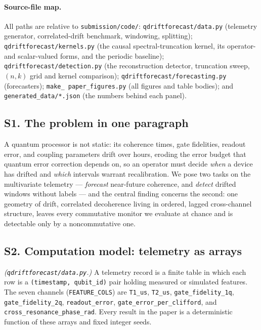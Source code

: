 \documentclass[
  aps,
  prresearch,
  reprint,
  amsmath,
  amssymb,
  nofootinbib,
  floatfix,
]{revtex4-2}
\begin{document}
\paragraph{Source-file map.} All paths are relative to \texttt{submission/code/}:
\texttt{qdriftforecast/data.py} (telemetry generator, correlated-drift benchmark,
windowing, splitting); \texttt{qdriftforecast/kernels.py} (the causal
spectral-truncation kernel, its operator- and scalar-valued forms, and the
periodic baseline); \texttt{qdriftforecast/detection.py} (the reconstruction
detector, truncation sweep, $(n,k)$ grid and kernel comparison);
\texttt{qdriftforecast/forecasting.py} (forecasters); \texttt{make\_\allowbreak
paper\_\allowbreak figures.py} (all figures and table bodies); and
\texttt{generated\_\allowbreak data/*.json} (the numbers behind each panel).

\subsection*{S1. The problem in one paragraph}
A quantum processor is not static: its coherence times, gate fidelities, readout
error, and coupling parameters drift over hours, eroding the error budget that
quantum error correction depends on, so an operator must decide \emph{when} a device
has drifted and \emph{which} intervals warrant recalibration. We pose two tasks on
the multivariate telemetry --- \emph{forecast} near-future coherence, and
\emph{detect} drifted windows without labels --- and the central finding concerns the
second: one geometry of drift, correlated decoherence living in ordered, lagged
cross-channel structure, leaves every commutative monitor we evaluate at chance and
is detectable only by a noncommutative one.

\subsection*{S2. Computation model: telemetry as arrays}
\emph{(\texttt{qdriftforecast/data.py}.)} A telemetry record is a finite table in
which each row is a \texttt{(timestamp, qubit\_id)} pair holding measured or
simulated features. The seven channels (\texttt{FEATURE\_COLS}) are \texttt{T1\_us},
\texttt{T2\_us}, \texttt{gate\_fidelity\_1q}, \texttt{gate\_fidelity\_2q},
\texttt{readout\_error}, \texttt{gate\_error\_per\_clifford}, and
\texttt{cross\_resonance\_phase\_rad}. Every result in the paper is a deterministic
function of these arrays and fixed integer seeds.
\end{document}
